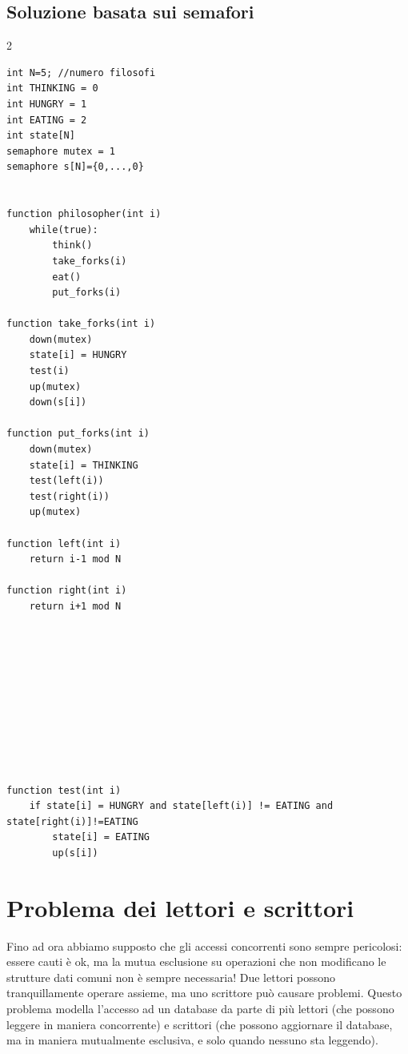 \documentclass{report}
\begin{document}
\subsection{Soluzione basata sui semafori}
\begin{multicols}{2}
\begin{verbatim}
int N=5; //numero filosofi
int THINKING = 0
int HUNGRY = 1
int EATING = 2
int state[N]
semaphore mutex = 1
semaphore s[N]={0,...,0}


function philosopher(int i)
    while(true):
        think()
        take_forks(i)
        eat()
        put_forks(i)

function take_forks(int i)
    down(mutex)
    state[i] = HUNGRY
    test(i)
    up(mutex)
    down(s[i])

function put_forks(int i)
    down(mutex)
    state[i] = THINKING
    test(left(i))
    test(right(i))
    up(mutex)

function left(int i)
    return i-1 mod N

function right(int i)
    return i+1 mod N








    
\end{verbatim}
\end{multicols}

\begin{Verbatim}[fontsize=\small]

function test(int i)
    if state[i] = HUNGRY and state[left(i)] != EATING and state[right(i)]!=EATING
        state[i] = EATING
        up(s[i])
\end{Verbatim}

\newpage

\section{Problema dei lettori e scrittori}
Fino ad ora abbiamo supposto che gli accessi concorrenti sono sempre pericolosi: essere cauti è ok, ma la mutua esclusione su operazioni che non modificano le strutture dati comuni non è sempre necessaria! Due lettori possono tranquillamente operare assieme, ma uno scrittore può causare problemi. Questo problema modella l'accesso ad un database da parte di più lettori (che possono leggere in maniera concorrente) e scrittori (che possono aggiornare il database, ma in maniera mutualmente esclusiva, e solo quando nessuno sta leggendo).
\end{document}
